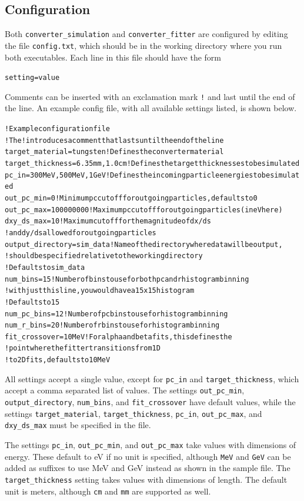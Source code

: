 \documentclass[12pt]{article}
\newcommand{\exes}{\texttt{converter\_simulation}\xspace}
\newcommand{\exef}{\texttt{converter\_fitter}\xspace}
\newcommand{\configfile}{\texttt{config.txt}\xspace}
\newcommand{\targetm}{\texttt{target\_material}\xspace}
\newcommand{\targett}{\texttt{target\_thickness}\xspace}
\newcommand{\pcin}{\texttt{pc\_in}\xspace}
\newcommand{\outpcmin}{\texttt{out\_pc\_min}\xspace}
\newcommand{\outpcmax}{\texttt{out\_pc\_max}\xspace}
\newcommand{\dxydsmax}{\texttt{dxy\_ds\_max}\xspace}
\newcommand{\outdir}{\texttt{output\_directory}\xspace}
\newcommand{\numbins}{\texttt{num\_bins}\xspace}
\newcommand{\fitxpt}{\texttt{fit\_crossover}\xspace}
\newenvironment{example}
  {\vspace{-2.6ex} \begin{alltt}}
  {\end{alltt} \vspace{-2.3ex}}
\begin{document}
\subsection{Configuration} Both \exes and \exef are configured by editing the file \configfile,
which should be in the working directory where you run both executables.  Each line in this file
should have the form
\begin{example}
  setting = value
\end{example}
Comments can be inserted with an exclamation mark \texttt{!} and last until the end of the line.
An example config file, with all available settings listed, is shown below.
\begin{example}
  ! Example configuration file
  ! The ! introduces a comment that lasts until the end of the line
  target_material = tungsten ! Defines the converter material
  target_thickness = 6.35 mm, 1.0 cm ! Defines the target thicknesses to be simulated
  pc_in = 300 MeV, 500 MeV, 1 GeV ! Defines the incoming particle energies to be simulated
  out_pc_min = 0 ! Minimum pc cutoff for outgoing particles, defaults to 0
  out_pc_max = 100000000 ! Maximum pc cutoff for outgoing particles (in eV here)
  dxy_ds_max = 10 ! Maximum cutoff for the magnitude of dx/ds
                  ! and dy/ds allowed for outgoing particles
  output_directory = sim_data ! Name of the directory where data will be output,
                              ! should be specified relative to the working directory
                              ! Defaults to sim_data
  num_bins = 15 ! Number of bins to use for both pc and r histogram binning
                ! with just this line, you would have a 15x15 histogram
                ! Defaults to 15
  num_pc_bins = 12 ! Number of pc bins to use for histogram binning
  num_r_bins = 20 ! Number of r bins to use for histogram binning
  fit_crossover = 10 MeV ! For alpha and beta fits, this defines the
                         ! point where the fitter transitions from 1D
                         ! to 2D fits, defaults to 10 MeV
\end{example}

All settings accept a single value, except for \pcin and \targett, which accept a comma separated
list of values.  The settings \outpcmin, \outdir, \numbins, and \fitxpt have default values, while
the settings \targetm, \targett, \pcin, \outpcmax, and \dxydsmax must be specified in the file.

The settings \pcin, \outpcmin, and \outpcmax take values with dimensions of energy.  These default
to eV if no unit is specified, although \texttt{MeV} and \texttt{GeV} can be added as suffixes to
use MeV and GeV instead as shown in the sample file.  The \targett setting takes values with
dimensions of length.  The default unit is meters, although \texttt{cm} and \texttt{mm} are
supported as well.
\end{document}
